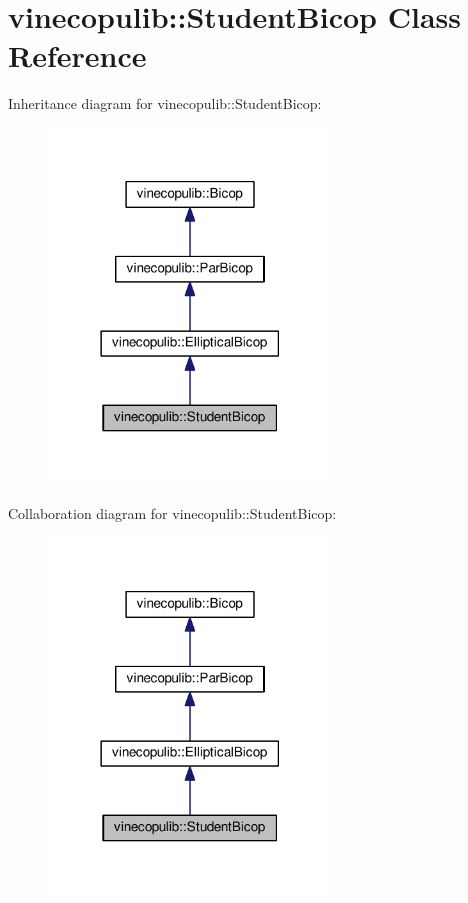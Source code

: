 \hypertarget{classvinecopulib_1_1_student_bicop}{}\section{vinecopulib\+:\+:Student\+Bicop Class Reference}
\label{classvinecopulib_1_1_student_bicop}


Inheritance diagram for vinecopulib\+:\+:Student\+Bicop\+:\nopagebreak
\begin{figure}[H]
\begin{center}
\leavevmode
\includegraphics[width=213pt]{classvinecopulib_1_1_student_bicop__inherit__graph}
\end{center}
\end{figure}


Collaboration diagram for vinecopulib\+:\+:Student\+Bicop\+:\nopagebreak
\begin{figure}[H]
\begin{center}
\leavevmode
\includegraphics[width=213pt]{classvinecopulib_1_1_student_bicop__coll__graph}
\end{center}
\end{figure}
